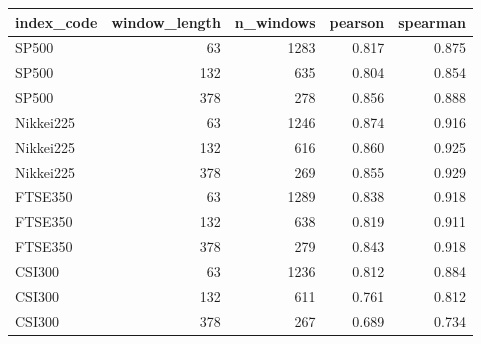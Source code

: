 \begin{tabular}{lrrrr}
\toprule
index\_code & window\_length & n\_windows & pearson & spearman \\
\midrule
SP500 & 63 & 1283 & 0.817 & 0.875 \\
SP500 & 132 & 635 & 0.804 & 0.854 \\
SP500 & 378 & 278 & 0.856 & 0.888 \\
Nikkei225 & 63 & 1246 & 0.874 & 0.916 \\
Nikkei225 & 132 & 616 & 0.860 & 0.925 \\
Nikkei225 & 378 & 269 & 0.855 & 0.929 \\
FTSE350 & 63 & 1289 & 0.838 & 0.918 \\
FTSE350 & 132 & 638 & 0.819 & 0.911 \\
FTSE350 & 378 & 279 & 0.843 & 0.918 \\
CSI300 & 63 & 1236 & 0.812 & 0.884 \\
CSI300 & 132 & 611 & 0.761 & 0.812 \\
CSI300 & 378 & 267 & 0.689 & 0.734 \\
\bottomrule
\end{tabular}
